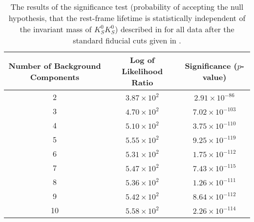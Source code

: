 \begin{table}[ht]
    \begin{center}
        \begin{tabular}{ccc}\toprule
            Number of Background Components & Log of Likelihood Ratio & Significance ($p$-value) \\\midrule
             2 & $3.87 \times 10^{2}$ & $2.91 \times 10^{-86}$ \\
             3 & $4.70 \times 10^{2}$ & $7.02 \times 10^{-103}$ \\
             4 & $5.10 \times 10^{2}$ & $3.75 \times 10^{-110}$ \\
             5 & $5.55 \times 10^{2}$ & $9.25 \times 10^{-119}$ \\
             6 & $5.31 \times 10^{2}$ & $1.75 \times 10^{-112}$ \\
             7 & $5.47 \times 10^{2}$ & $7.43 \times 10^{-115}$ \\
             8 & $5.36 \times 10^{2}$ & $1.26 \times 10^{-111}$ \\
             9 & $5.42 \times 10^{2}$ & $8.64 \times 10^{-112}$ \\
             10 & $5.58 \times 10^{2}$ & $2.26 \times 10^{-114}$ \\\bottomrule
        \end{tabular}
        \caption{The results of the significance test (probability of accepting the null hypothesis, that the rest-frame lifetime is statistically independent of the invariant mass of $K_S^0K_S^0$) described in  for all data after the standard fiducial cuts given in .}\label{tab:independence-test}
    \end{center}
\end{table}